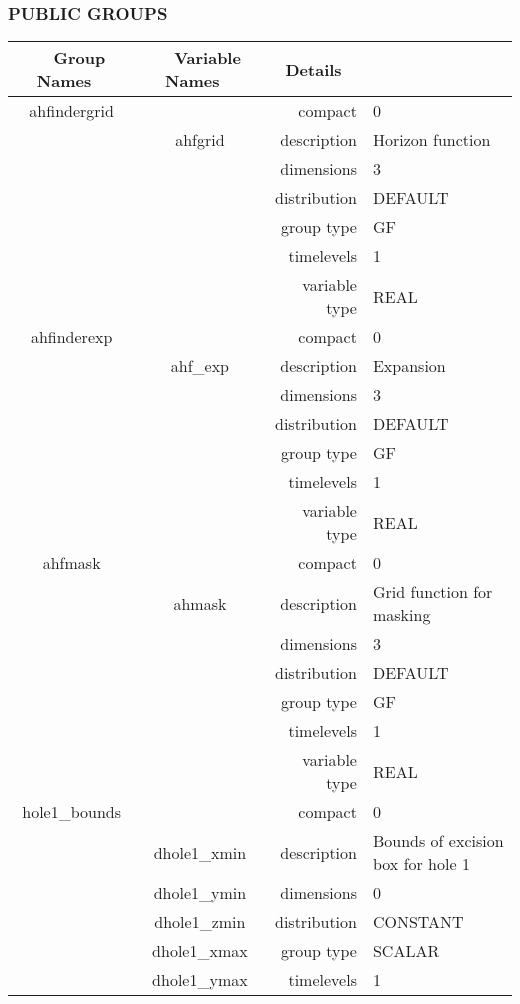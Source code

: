 \vspace{5mm}\subsubsection{PUBLIC GROUPS}

\vspace{5mm}

\begin{tabular*}{150mm}{|c|c@{\extracolsep{\fill}}|rl|} \hline 
~ {\bf Group Names} ~ & ~ {\bf Variable Names} ~  &{\bf Details} ~ & ~\\ 
\hline 
ahfindergrid &  & compact & 0 \\ 
 & ahfgrid & description & Horizon function \\ 
 &  & dimensions & 3 \\ 
 &  & distribution & DEFAULT \\ 
 &  & group type & GF \\ 
 &  & timelevels & 1 \\ 
 &  & variable type & REAL \\ 
\hline 
ahfinderexp &  & compact & 0 \\ 
 & ahf\_exp & description & Expansion \\ 
 &  & dimensions & 3 \\ 
 &  & distribution & DEFAULT \\ 
 &  & group type & GF \\ 
 &  & timelevels & 1 \\ 
 &  & variable type & REAL \\ 
\hline 
ahfmask &  & compact & 0 \\ 
 & ahmask & description & Grid function for masking \\ 
 &  & dimensions & 3 \\ 
 &  & distribution & DEFAULT \\ 
 &  & group type & GF \\ 
 &  & timelevels & 1 \\ 
 &  & variable type & REAL \\ 
\hline 
hole1\_bounds &  & compact & 0 \\ 
 & dhole1\_xmin & description & Bounds of excision box for hole 1 \\ 
 & dhole1\_ymin & dimensions & 0 \\ 
 & dhole1\_zmin & distribution & CONSTANT \\ 
 & dhole1\_xmax & group type & SCALAR \\ 
 & dhole1\_ymax & timelevels & 1 \\ 

\end{tabular*}

